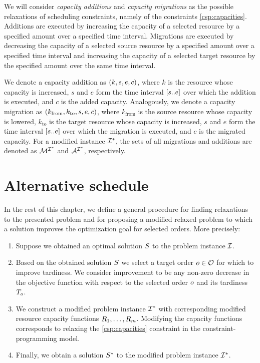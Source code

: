 We will consider \emph{capacity additions} and \emph{capacity migrations} as the possible relaxations
of scheduling constraints, namely of the constraints \eqref{csp:capacities}.
Additions are executed by increasing the capacity of a selected resource
by a specified amount over a specified time interval.
Migrations are executed by decreasing the capacity of a selected source resource
by a specified amount over a specified time interval
and increasing the capacity of a selected target resource
by the specified amount over the same time interval.

We denote a capacity addition as $(k, s, e, c)$, where
$k$ is the resource whose capacity is increased,
$s$ and $e$ form the time interval $[{s}..{e}]$ over which the addition is executed, and
$c$ is the added capacity.
Analogously, we denote a capacity migration as $(k_{\text{from}}, k_{\text{to}}, s, e, c)$, where
$k_{\text{from}}$ is the source resource whose capacity is lowered,
$k_{\text{to}}$ is the target resource whose capacity is increased,
$s$ and $e$ form the time interval $[{s}..{e}]$ over which the migration is executed, and
$c$ is the migrated capacity.
For a modified instance $\mathcal{I}^*$, the sets of all migrations and additions are denoted as
$\mathcal{M}^{\mathcal{I}^*}$ and $\mathcal{A}^{\mathcal{I}^*}$, respectively.

\section{Alternative schedule} \label{sec:alternative-schedule}

In the rest of this chapter, we define a general procedure for finding relaxations to the presented problem
and for proposing a modified relaxed problem to which a solution improves the optimization goal for selected orders.
More precisely:

\begin{enumerate}
    \item Suppose we obtained an optimal solution $S$ to the problem instance $\mathcal{I}$.

    \item Based on the obtained solution $S$ we select a target order $o \in \mathcal{O}$
        for which to improve tardiness.
        We consider improvement to be any non-zero decrease in the objective function with respect to the
        selected order $o$ and its tardiness $T_{o}$.

    \item We construct a modified problem instance $\mathcal{I}^*$ with corresponding modified
        resource capacity functions $R_{1}, \dots, R_{m}$.
        Modifying the capacity functions corresponds to relaxing the \eqref{csp:capacities} constraint
        in the constraint-programming model.

    \item Finally, we obtain a solution $S^*$ to the modified problem instance $\mathcal{I}^*$.
\end{enumerate}
